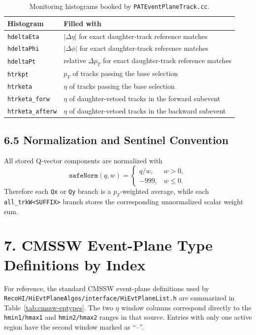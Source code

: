 \documentclass[11pt]{article}
\begin{document}
\begin{table}[h]
\centering
\small
\begin{tabular}{ll}
\toprule
Histogram & Filled with \\
\midrule
\texttt{hdeltaEta} & $|\Delta\eta|$ for exact daughter-track reference matches \\
\texttt{hdeltaPhi} & $|\Delta\phi|$ for exact daughter-track reference matches \\
\texttt{hdeltaPt} & relative $\Delta p_{T}$ for exact daughter-track reference matches \\
\texttt{htrkpt} & $p_{T}$ of tracks passing the base selection \\
\texttt{htrketa} & $\eta$ of tracks passing the base selection \\
\texttt{htrketa\_forw} & $\eta$ of daughter-vetoed tracks in the forward subevent \\
\texttt{htrketa\_afterw} & $\eta$ of daughter-vetoed tracks in the backward subevent \\
\bottomrule
\end{tabular}
\caption{Monitoring histograms booked by \texttt{PATEventPlaneTrack.cc}.}
\label{tab:patep-monitoring-hists}
\end{table}

\subsection*{6.5 Normalization and Sentinel Convention}

All stored Q-vector components are normalized with
\[
\texttt{safeNorm}(q,w) =
\begin{cases}
q / w, & w > 0,\\
-999, & w \le 0.
\end{cases}
\]
Therefore each \texttt{Qx} or \texttt{Qy} branch is a $p_{T}$-weighted average, while
each \texttt{all\_trkW<SUFFIX>} branch stores the corresponding unnormalized scalar
weight sum.

\section*{7. CMSSW Event-Plane Type Definitions by Index}

For reference, the standard CMSSW event-plane definitions used by
\texttt{RecoHI/HiEvtPlaneAlgos/interface/HiEvtPlaneList.h} are summarized in
Table~\ref{tab:cmssw-eptypes}. The two $\eta$ window columns correspond directly to
the \texttt{hmin1/hmax1} and \texttt{hmin2/hmax2} ranges in that source. Entries with
only one active region have the second window marked as ``--''.
\end{document}
